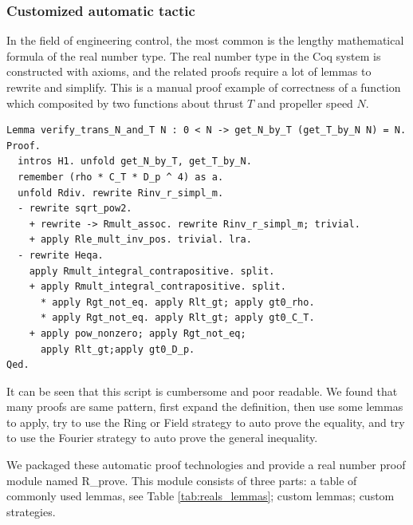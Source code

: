 \documentclass{article} %
\numberwithin{equation}{section} %
\begin{document}
\subsubsection{Customized automatic tactic}

In the field of engineering control, the most common is the lengthy mathematical formula of the real number type. 
The real number type in the Coq system is constructed with axioms, and the related proofs require a lot of lemmas to rewrite and simplify.
This is a manual proof example of correctness of a function which composited by two functions about thrust $T$ and propeller speed $N$.
\begin{verbatim}
Lemma verify_trans_N_and_T N : 0 < N -> get_N_by_T (get_T_by_N N) = N.
Proof.
  intros H1. unfold get_N_by_T, get_T_by_N.
  remember (rho * C_T * D_p ^ 4) as a.
  unfold Rdiv. rewrite Rinv_r_simpl_m.
  - rewrite sqrt_pow2.
    + rewrite -> Rmult_assoc. rewrite Rinv_r_simpl_m; trivial.
    + apply Rle_mult_inv_pos. trivial. lra.
  - rewrite Heqa.
    apply Rmult_integral_contrapositive. split.
    + apply Rmult_integral_contrapositive. split.
      * apply Rgt_not_eq. apply Rlt_gt; apply gt0_rho.
      * apply Rgt_not_eq. apply Rlt_gt; apply gt0_C_T.
    + apply pow_nonzero; apply Rgt_not_eq; 
      apply Rlt_gt;apply gt0_D_p.
Qed.
\end{verbatim}

It can be seen that this script is cumbersome and poor readable.
We found that many proofs are same pattern, first expand the definition, then use some lemmas to apply, try to use the Ring or Field strategy to auto prove the equality, and try to use the Fourier strategy to auto prove the general inequality.

We packaged these automatic proof technologies and provide a real number proof module named R\_prove.
This module consists of three parts: a table of commonly used lemmas, see Table \ref{tab:reals_lemmas}; custom lemmas; custom strategies.
\end{document}
